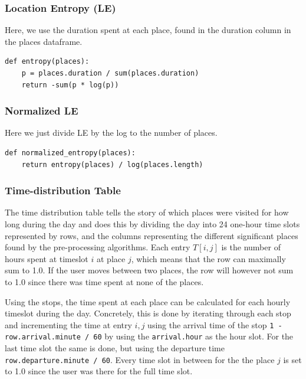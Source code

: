 \subsubsection{Location Entropy (LE)} 
Here, we use the duration spent at each place, found in the duration column in the places dataframe.

\begin{verbatim}
def entropy(places):
    p = places.duration / sum(places.duration)
    return -sum(p * log(p))
\end{verbatim}

\subsubsection{Normalized LE} 
Here we just divide LE by the log to the number of places.

\begin{verbatim}
def normalized_entropy(places):
    return entropy(places) / log(places.length)
\end{verbatim}

\subsubsection{Time-distribution Table}
The time distribution table tells the story of which places were visited for how long during the day and does this by dividing the day into 24 one-hour time slots represented by rows, and the columns representing the different significant places found by the pre-processing algorithms. Each entry $T[i,j]$ is the number of hours spent at timeslot $i$ at place $j$, which means that the row can maximally sum to 1.0. If the user moves between two places, the row will however not sum to 1.0 since there was time spent at none of the places.

Using the stops, the time spent at each place can be calculated for each hourly timeslot during the day. Concretely, this is done by iterating through each stop and incrementing the time at entry $i,j$ using the arrival time of the stop \verb|1 - row.arrival.minute / 60| by using the \verb|arrival.hour| as the hour slot. For the last time slot the same is done, but using the departure time \verb|row.departure.minute / 60|. Every time slot in between for the the place $j$ is set to 1.0 since the user was there for the full time slot.

